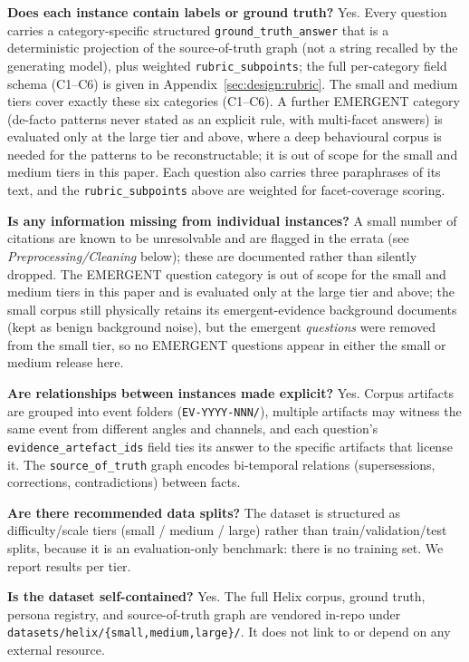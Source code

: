 \textbf{Does each instance contain labels or ground truth?}
Yes. Every question carries a category-specific structured
\texttt{ground\_truth\_answer} that is a deterministic projection of the
source-of-truth graph (not a string recalled by the generating model), plus
weighted \texttt{rubric\_subpoints}; the full per-category field schema
(C1--C6) is given in Appendix~\ref{sec:design:rubric}. The small and medium
tiers cover exactly these six
categories (C1--C6). A further EMERGENT category (de-facto patterns never stated
as an explicit rule, with multi-facet answers) is evaluated only at the large
tier and above, where a deep behavioural corpus is needed for the patterns to be
reconstructable; it is out of scope for the small and medium tiers in this paper.
Each question also carries three paraphrases of its text, and the
\texttt{rubric\_subpoints} above are weighted for facet-coverage scoring.

\textbf{Is any information missing from individual instances?}
A small number of citations are known to be unresolvable and are flagged in the
errata (see \emph{Preprocessing/Cleaning} below); these are documented rather
than silently dropped. The EMERGENT question category is out of scope for the
small and medium tiers in this paper and is evaluated only at the large tier and
above; the small corpus still physically retains its emergent-evidence background
documents (kept as benign background noise), but the emergent \emph{questions}
were removed from the small tier, so no EMERGENT questions appear in either the
small or medium release here.

\textbf{Are relationships between instances made explicit?}
Yes. Corpus artifacts are grouped into event folders (\texttt{EV-YYYY-NNN/}),
multiple artifacts may witness the same event from different angles and channels,
and each question's \texttt{evidence\_artefact\_ids} field ties its answer to the
specific artifacts that license it. The \texttt{source\_of\_truth} graph encodes
bi-temporal relations (supersessions, corrections, contradictions) between facts.

\textbf{Are there recommended data splits?}
The dataset is structured as difficulty/scale tiers (small / medium / large)
rather than train/validation/test splits, because it is an evaluation-only
benchmark: there is no training set. We report results per tier.

\textbf{Is the dataset self-contained?}
Yes. The full Helix corpus, ground truth, persona registry, and source-of-truth
graph are vendored in-repo under \texttt{datasets/helix/\{small,medium,large\}/}.
It does not link to or depend on any external resource.

